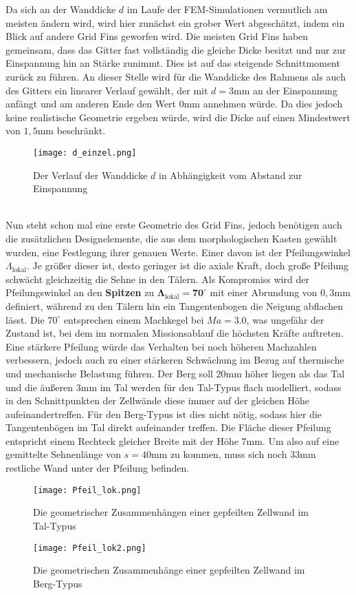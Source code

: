 Da sich an der Wanddicke $d$ im Laufe der FEM-Simulationen vermutlich am meisten ändern wird, wird hier zunächst ein grober Wert abgeschätzt, indem ein Blick auf andere Grid Fins geworfen wird. Die meisten Grid Fins haben gemeinsam, dass das Gitter fast vollständig die gleiche Dicke besitzt und nur zur Einspannung hin an Stärke zunimmt. Dies ist auf das steigende Schnittmoment zurück zu führen. An dieser Stelle wird für die Wanddicke des Rahmens als auch des Gitters ein linearer Verlauf gewählt, der mit $d=3$mm an der Einspannung anfängt und am anderen Ende den Wert $0$mm annehmen würde. Da dies jedoch keine realistische Geometrie ergeben würde, wird die Dicke auf einen Mindestwert von $1,5$mm beschränkt.
\begin{figure}[h]
	\centering
	\texttt{[image: d\_einzel.png]}
	\caption{Der Verlauf der Wanddicke $d$ in Abhängigkeit vom Abstand zur Einspannung}
	\label{abb_d_einzel}
\end{figure}\\
Nun steht schon mal eine erste Geometrie des Grid Fins, jedoch benötigen auch die zusätzlichen Designelemente, die aus dem morphologischen Kasten gewählt wurden, eine Festlegung ihrer genauen Werte. Einer davon ist der Pfeilungswinkel $\Lambda_\mathrm{lokal}$. Je größer dieser ist, desto geringer ist die axiale Kraft, doch große Pfeilung schwächt gleichzeitig die Sehne in den Tälern. Als Kompromiss wird der Pfeilungswinkel an den \textbf{Spitzen} zu $\mathbf{\Lambda_\mathrm{lokal}=70^\circ}$ mit einer Abrundung von $0,3$mm definiert, während zu den Tälern hin ein Tangentenbogen die Neigung abflachen lässt. Die $70^\circ$ entsprechen einem Machkegel bei $Ma = 3.0$, was ungefähr der Zustand ist, bei dem im normalen Missionsablauf die höchsten Kräfte auftreten. Eine stärkere Pfeilung würde das Verhalten bei noch höheren Machzahlen verbessern, jedoch auch zu einer stärkeren Schwächung im Bezug auf thermische und mechanische Belastung führen. Der Berg soll $20$mm höher liegen als das Tal und die äußeren $3$mm im Tal werden für den Tal-Typus flach modelliert, sodass in den Schnittpunkten der Zellwände diese immer auf der gleichen Höhe aufeinandertreffen. Für den Berg-Typus ist dies nicht nötig, sodass hier die Tangentenbögen im Tal direkt aufeinander treffen. Die Fläche dieser Pfeilung entspricht einem Rechteck gleicher Breite mit der Höhe $7$mm. Um also auf eine gemittelte Sehnenlänge von $s=40$mm zu kommen, muss sich noch $33$mm restliche Wand unter der Pfeilung befinden.
\begin{figure}[h]
	\begin{minipage}[t]{0.45\linewidth}
		\centering
		\texttt{[image: Pfeil\_lok.png]}
		\caption{Die geometrischer Zusammenhängen einer gepfeilten Zellwand im Tal-Typus}
		\label{abb_lok_Tal}
	\end{minipage}
	\hfill
	\begin{minipage}[t]{0.45\linewidth}
		\centering
		\texttt{[image: Pfeil\_lok2.png]}
		\caption{Die geometrischen Zusammenhänge einer gepfeilten Zellwand im Berg-Typus}
		\label{abb_lok_Berg}
	\end{minipage}
\end{figure}\\
